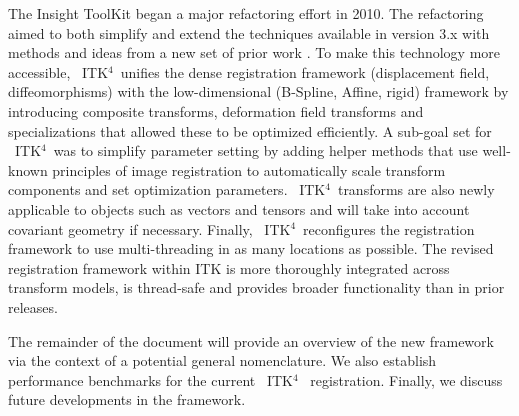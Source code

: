 \documentclass{llncs}
\newcommand{\tk}{~ITK$^{\text{4}}$~}
\begin{document}
The Insight ToolKit began a major refactoring effort in 2010.
The refactoring aimed to both simplify and extend the techniques available in version
3.x with methods and ideas from a new set of prior work
\cite{Jenkinson2001,Christensen1996,Rueckert1999,Miller2005,Peyrat2010,Avants2011}.
To make this technology more accessible, \tk unifies the dense
registration framework (displacement field, diffeomorphisms)
with the low-dimensional (B-Spline, Affine, rigid) framework by
introducing composite transforms, deformation field transforms and
specializations that allowed these to be optimized efficiently.  A sub-goal set for \tk was to simplify
parameter setting by adding helper methods that use well-known
principles of image registration to automatically scale transform
components and set optimization parameters.  \tk transforms are also
newly applicable to objects such as vectors and tensors and will take into account covariant geometry if
necessary.  Finally, \tk reconfigures the registration framework
to use multi-threading in as many locations as possible.
The revised registration framework within ITK is more thoroughly
integrated across transform models, is thread-safe and provides
broader functionality than in prior releases. 




The remainder of the document will provide an overview of the new
framework via the context of a potential general nomenclature.  We
also establish performance benchmarks for the current \tk
registration.  Finally, we discuss future developments in the
framework.
\end{document}
